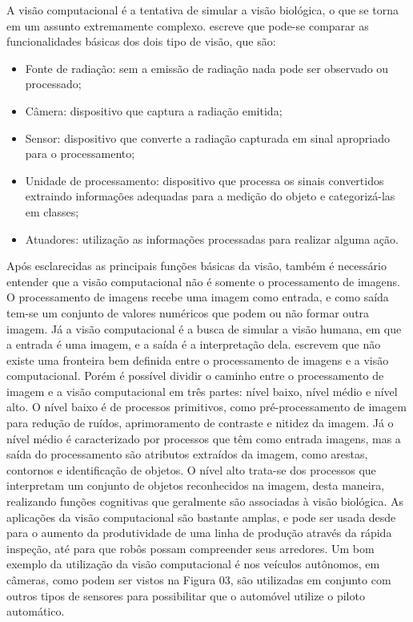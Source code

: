A visão computacional é a tentativa de simular a visão biológica, o que se torna em um assunto extremamente complexo. \cite{jahne} escreve que pode-se comparar as funcionalidades básicas dos dois tipo de visão, que são:

\begin{itemize}
	\item Fonte de radiação: sem a emissão de radiação nada pode ser observado ou processado;
	
	\item Câmera: dispositivo que captura a radiação emitida;
	
	\item Sensor: dispositivo que converte a radiação capturada em sinal apropriado para o processamento;
	
    \item Unidade de processamento: dispositivo que processa os sinais convertidos extraindo informações adequadas para a medição do objeto e categorizá-las em classes;
    \item Atuadores: utilização as informações processadas para realizar alguma ação.
    
\end{itemize}

Após esclarecidas as principais funções básicas da visão, também é necessário entender que a visão computacional não é somente o processamento de imagens. O processamento de imagens recebe uma imagem como entrada, e como saída tem-se um conjunto de valores numéricos que podem ou não formar outra imagem. Já a visão computacional é a busca de simular a visão humana, em que a entrada é uma imagem, e a saída é a interpretação dela. 
\cite{gonzalez} escrevem que não existe uma fronteira bem definida entre o processamento de imagens e a visão computacional. Porém é possível dividir o caminho entre o processamento de imagem e a visão computacional em três partes: nível baixo, nível médio e nível alto. O nível baixo é de processos primitivos, como pré-processamento de imagem para redução de ruídos, aprimoramento de contraste e nitidez da imagem. Já o nível médio é caracterizado por processos que têm como entrada imagens, mas a saída do processamento são atributos extraídos da imagem, como arestas, contornos e identificação de objetos. O nível alto trata-se dos processos que interpretam um conjunto de objetos reconhecidos na imagem, desta maneira, realizando funções cognitivas que geralmente são associadas à visão biológica.
As aplicações da visão computacional são bastante amplas, e pode ser usada desde para o aumento da produtividade de uma linha de produção através da rápida inspeção, até para que robôs possam compreender seus arredores. Um bom exemplo da utilização da visão computacional é nos veículos autônomos, em câmeras, como podem ser vistos na Figura 03, são utilizadas em conjunto com outros tipos de sensores para possibilitar que o automóvel utilize o piloto automático. 

